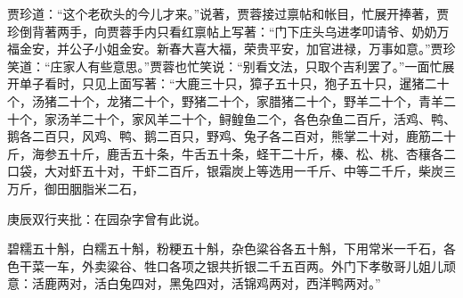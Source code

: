 \begin{parag}
    贾珍道：“这个老砍头的今儿才来。”说著，贾蓉接过禀帖和帐目，忙展开捧著，贾珍倒背著两手，向贾蓉手内只看红禀帖上写著：“门下庄头乌进孝叩请爷、奶奶万福金安，并公子小姐金安。新春大喜大福，荣贵平安，加官进禄，万事如意。”贾珍笑道：“庄家人有些意思。”贾蓉也忙笑说：“别看文法，只取个吉利罢了。”一面忙展开单子看时，只见上面写著：“大鹿三十只，獐子五十只，狍子五十只，暹猪二十个，汤猪二十个，龙猪二十个，野猪二十个，家腊猪二十个，野羊二十个，青羊二十个，家汤羊二十个，家风羊二十个，鲟鳇鱼二个，各色杂鱼二百斤，活鸡、鸭、鹅各二百只，风鸡、鸭、鹅二百只，野鸡、兔子各二百对，熊掌二十对，鹿筋二十斤，海参五十斤，鹿舌五十条，牛舌五十条，蛏干二十斤，榛、松、桃、杏穰各二口袋，大对虾五十对，干虾二百斤，银霜炭上等选用一千斤、中等二千斤，柴炭三万斤，御田胭脂米二石，\begin{note}庚辰双行夹批：在园杂字曾有此说。\end{note}碧糯五十斛，白糯五十斛，粉粳五十斛，杂色粱谷各五十斛，下用常米一千石，各色干菜一车，外卖粱谷、牲口各项之银共折银二千五百两。外门下孝敬哥儿姐儿顽意：活鹿两对，活白兔四对，黑兔四对，活锦鸡两对，西洋鸭两对。”
\end{parag}


